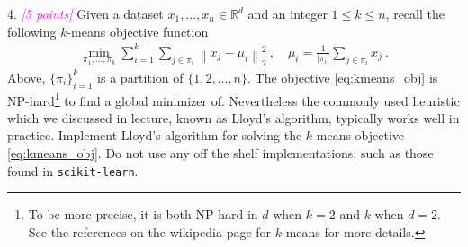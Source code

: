 \documentclass{article}
\newcommand{\field}[1]{\mathbb{#1}}
\newcommand{\1}{\mathbf{1}}
\newcommand{\R}{\field{R}} %
\newcommand{\norm}[1]{\left\|#1\right\|}
\newcommand{\grade}[1]{\small\textcolor{magenta}{\emph{[#1 points]}} \normalsize}
\begin{document}
4. \grade{5} Given a dataset $x_1,..., x_n \in \R^{d}$ and an integer $1 \leq k \leq n$, recall the following $k$-means objective function
\begin{align}
    \min_{\pi_1, ..., \pi_k} \sum_{i=1}^{k} \sum_{j \in \pi_i} \norm{ x_j - \mu_{i} }^2_2 \ , \quad \mu_i = \frac{1}{|\pi_i|} \sum_{j \in \pi_i} x_j \ . \label{eq:kmeans_obj}
\end{align}
Above, $\{\pi_i\}_{i=1}^{k}$ is a partition of $\{1, 2, ..., n\}$. The objective \eqref{eq:kmeans_obj} is NP-hard\footnote{
To be more precise, it is both NP-hard in $d$ when $k=2$ and $k$ when $d=2$.
See the references on the wikipedia page for $k$-means for more details.
} to find a global minimizer of. Nevertheless the commonly used heuristic which we discussed in lecture, known as Lloyd's algorithm, typically works well in practice.
Implement Lloyd's algorithm for solving the $k$-means objective \eqref{eq:kmeans_obj}.
Do not use any off the shelf implementations, such as those found in \texttt{scikit-learn}.
\end{document}
